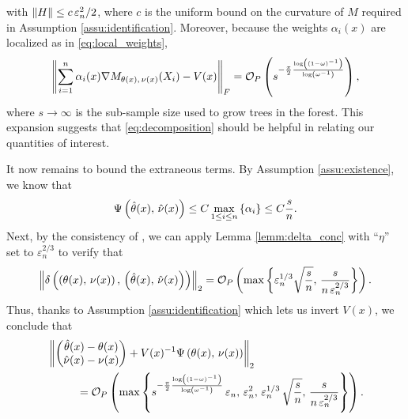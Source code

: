 \documentclass[aos]{imsart}
\theoremstyle{plain}
\theoremstyle{definition}
\theoremstyle{remark}
\begin{document}
\begin{CJK}{UTF8}{gbsn}
\begin{appendix}
with $\left\lVert H\right\rVert \leq c\,\varepsilon_n^2/2$, where $c$ is the uniform bound on the curvature
of $M$ required in Assumption \ref{assu:identification}.
Moreover, because the weights $\alpha_i(x)$ are localized as in \eqref{eq:local_weights},
\begin{equation}
\label{eq:first_bound}
\Norm{\sum_{i = 1}^n \alpha_i(x) \nabla M_{\theta(x), \, \nu(x)}(X_i) - V(x)}_F = \oo_P\p{s^{-\frac{\pi}{2}\frac{\log\p{\p{1 - \omega}^{-1}}}{\log\p{\omega^{-1}}}}},
\end{equation}
where $s \rightarrow \infty$ is the sub-sample size used to grow trees in the forest.
This expansion suggests that \eqref{eq:decomposition} should be helpful in relating
our quantities of interest.

It now remains to bound the extraneous terms.
By Assumption \ref{assu:existence}, we know that
$$ \Psi\left(\hat{\theta}(x), \, \hat{\nu}(x)\right) \leq C \max_{1 \leq i \leq n} \left\{\alpha_i\right\} \leq C \frac{s}{n}. $$
Next, by the consistency of ,
we can apply Lemma \ref{lemm:delta_conc} with ``$\eta$''
set to $\varepsilon_n^{2/3}$ to verify that
$$\left\lVert\delta\left(\left(\theta(x), \, \nu(x)\right) , \, \left(\hat{\theta}(x), \, \hat{\nu}(x)\right)\right)\right\rVert_2 =
\mathcal{O}_P\left(\max\left\{\varepsilon_n^{1/3} \sqrt{\frac{s}{n}}, \, \frac{s}{n \, \varepsilon_n^{2/3}}\right\}\right). $$
Thus, thanks to Assumption \ref{assu:identification} which lets us invert $V(x)$,
we conclude that 
\begin{equation}
\label{eq:exact_coupling}
\begin{split}
&\Norm{\begin{pmatrix}
\htheta(x) - \theta(x) \\ \hnu(x) - \nu(x)
\end{pmatrix}
+ V(x)^{-1} \Psi\p{\theta(x), \, \nu(x)}}_2 \\
&\ \ \ \ \ \ \ \ = \oo_P\p{\max\cb{s^{-\frac{\pi}{2}\frac{\log\p{\p{1 - \omega}^{-1}}}{\log\p{\omega^{-1}}}} \, \varepsilon_n, \, \varepsilon_n^2, \,  \varepsilon_n^{1/3} \, \sqrt{\frac{s}{n}}, \, \frac{s}{n \, \varepsilon_n^{2/3}}}}. 
\end{split}
\end{equation}



\end{appendix}
\end{CJK}
\end{document}
